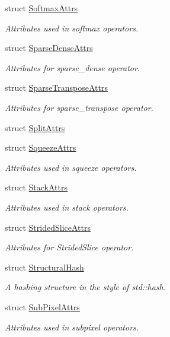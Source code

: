 \begin{DoxyCompactItemize}
struct \hyperlink{structtvm_1_1relay_1_1SoftmaxAttrs}{Softmax\+Attrs}
\begin{DoxyCompactList}\small\item\em Attributes used in softmax operators. \end{DoxyCompactList}\item 
struct \hyperlink{structtvm_1_1relay_1_1SparseDenseAttrs}{Sparse\+Dense\+Attrs}
\begin{DoxyCompactList}\small\item\em Attributes for sparse\+\_\+dense operator. \end{DoxyCompactList}\item 
struct \hyperlink{structtvm_1_1relay_1_1SparseTransposeAttrs}{Sparse\+Transpose\+Attrs}
\begin{DoxyCompactList}\small\item\em Attributes for sparse\+\_\+transpose operator. \end{DoxyCompactList}\item 
struct \hyperlink{structtvm_1_1relay_1_1SplitAttrs}{Split\+Attrs}
\item 
struct \hyperlink{structtvm_1_1relay_1_1SqueezeAttrs}{Squeeze\+Attrs}
\begin{DoxyCompactList}\small\item\em Attributes used in squeeze operators. \end{DoxyCompactList}\item 
struct \hyperlink{structtvm_1_1relay_1_1StackAttrs}{Stack\+Attrs}
\begin{DoxyCompactList}\small\item\em Attributes used in stack operators. \end{DoxyCompactList}\item 
struct \hyperlink{structtvm_1_1relay_1_1StridedSliceAttrs}{Strided\+Slice\+Attrs}
\begin{DoxyCompactList}\small\item\em Attributes for Strided\+Slice operator. \end{DoxyCompactList}\item 
struct \hyperlink{structtvm_1_1relay_1_1StructuralHash}{Structural\+Hash}
\begin{DoxyCompactList}\small\item\em A hashing structure in the style of std\+::hash. \end{DoxyCompactList}\item 
struct \hyperlink{structtvm_1_1relay_1_1SubPixelAttrs}{Sub\+Pixel\+Attrs}
\begin{DoxyCompactList}\small\item\em Attributes used in subpixel operators. \end{DoxyCompactList}\item 

\end{DoxyCompactItemize}
